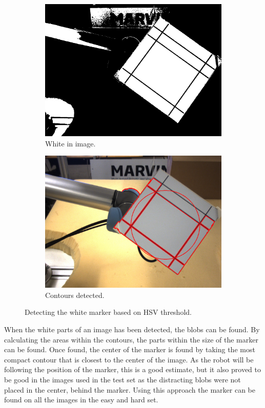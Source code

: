 \begin{figure}[H]
 \centering
 \begin{subfigure}{0.49\linewidth}
 \includegraphics[width=\linewidth]{graphics/hsv_white}
 \caption{White in image.}
 \end{subfigure}
 \begin{subfigure}{0.49\linewidth}
 \includegraphics[width=\linewidth]{graphics/hsv_white_contours}
 \caption{Contours detected.}
 \end{subfigure}
 \caption{Detecting the white marker based on HSV threshold.}
 \label{fig:hsv_marker1}
\end{figure}

When the white parts of an image has been detected, the blobs can be found.
By calculating the areas within the contours, the parts within the size of the marker can be found.
Once found, the center of the marker is found by taking the most compact contour that is closest to the center of the image.
As the robot will be following the position of the marker, this is a good estimate, but it also proved to be good in the images used in the test set as the distracting blobs were not placed in the center, behind the marker.
Using this approach the marker can be found on all the images in the easy and hard set.

